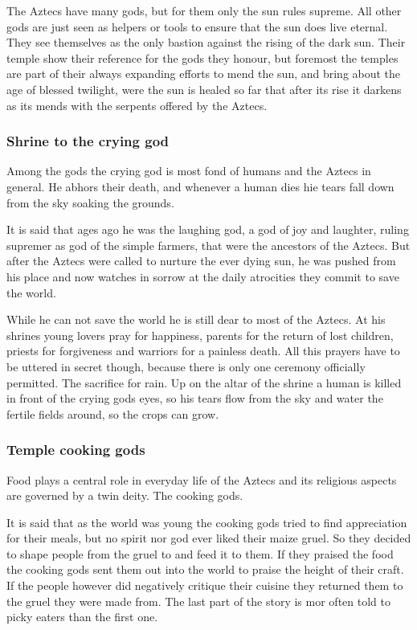 \documentclass[a4paper]{book}
\begin{document}
The \gls{Aztecs} have many gods, but for them only the sun rules supreme. All
other gods are just seen as helpers or tools to ensure that the sun does live
eternal. They see themselves as the only bastion against the rising of the dark
sun. Their temple show their reference for the gods they honour, but foremost
the temples are part of their always expanding efforts to mend the sun, and
bring about the age of blessed twilight, were the sun is healed so far that
after its rise it darkens as its mends with the serpents offered by the
\gls{Aztecs}.

\subsubsection{Shrine to the crying god}
Among the gods the crying god is most fond of humans and the \gls{Aztecs} in
general. He abhors their death, and whenever a human dies hie tears fall down
from the sky soaking the grounds.

It is said that ages ago he was the laughing god, a god of joy and laughter,
ruling supremer as god of the simple farmers, that were the ancestors of the
\gls{Aztecs}. But after the \gls{Aztecs} were called to nurture the ever dying
sun, he was pushed from his place and now watches in sorrow at the daily
atrocities they commit to save the world.

While he can not save the world he is still dear to most of the \gls{Aztecs}.
At his shrines young lovers pray for happiness, parents for the return of lost
children, priests for forgiveness and warriors for a painless death. All this
prayers have to be uttered in secret though, because there is only one ceremony
officially permitted. The sacrifice for rain. Up on the altar of the shrine a
human is killed in front of the crying gods eyes, so his tears flow from the
sky and water the fertile fields around, so the crops can grow.

\subsubsection{Temple cooking gods}
Food plays a central role in everyday life of the \gls{Aztecs} and its
religious aspects are governed by a twin deity. The cooking gods.

It is said that as the world was young the cooking gods tried to find
appreciation for their meals, but no spirit nor god ever liked their maize
gruel. So they decided to shape people from the gruel to and feed it to them.
If they praised the food the cooking gods sent them out into the world to
praise the height of their craft. If the people however did negatively critique
their cuisine they returned them to the gruel they were made from. The last
part of the story is mor often told to picky eaters than the first one.
\end{document}
